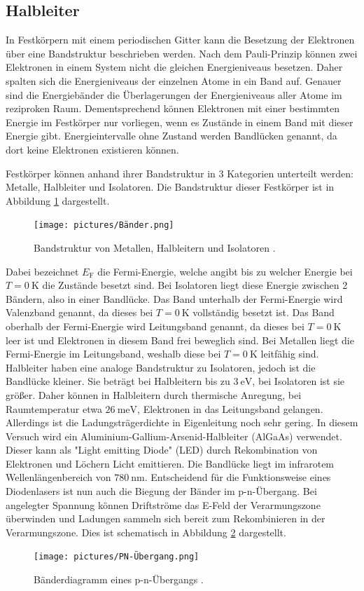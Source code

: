 \subsection{Halbleiter}
In Festkörpern mit einem periodischen Gitter kann die Besetzung der Elektronen über eine Bandstruktur beschrieben werden.
Nach dem Pauli-Prinzip können zwei Elektronen in einem System nicht die gleichen Energieniveaus besetzen. Daher spalten sich 
die Energieniveaus der einzelnen Atome in ein Band auf. Genauer sind die Energiebänder die Überlagerungen der Energieniveaus aller Atome im 
reziproken Raum. Dementsprechend können Elektronen mit einer bestimmten Energie im Festkörper nur vorliegen, wenn es Zustände in einem Band mit dieser 
Energie gibt. Energieintervalle ohne Zustand werden Bandlücken genannt, da dort keine Elektronen existieren können.

\noindent Festkörper können anhand ihrer Bandstruktur in 3 Kategorien unterteilt werden: Metalle, Halbleiter und Isolatoren.
Die Bandstruktur dieser Festkörper ist in Abbildung \ref{fig:Band} dargestellt.
\begin{figure}[H]
    \centering
    \texttt{[image: pictures/Bänder.png]}
    \caption{Bandstruktur von Metallen, Halbleitern und Isolatoren \cite{Demtröder}.}
    \label{fig:Band}
\end{figure}
\noindent Dabei bezeichnet $E_\text{F}$ die Fermi-Energie, welche angibt bis zu welcher Energie bei $T=\qty{0}{\kelvin}$ die Zustände besetzt sind.
Bei Isolatoren liegt diese Energie zwischen 2 Bändern, also in einer Bandlücke. Das Band unterhalb der Fermi-Energie wird Valenzband genannt, 
da dieses bei $T=\qty{0}{\kelvin}$ vollständig besetzt ist. Das Band oberhalb der Fermi-Energie wird Leitungsband genannt, da dieses bei $T=\qty{0}{\kelvin}$ leer ist und 
Elektronen in diesem Band frei beweglich sind. Bei Metallen liegt die Fermi-Energie im Leitungsband, weshalb diese bei $T=\qty{0}{\kelvin}$ leitfähig sind.
Halbleiter haben eine analoge Bandstruktur zu Isolatoren, jedoch ist die Bandlücke kleiner. Sie beträgt bei Halbleitern bis zu $\qty{3}{\eV}$, bei Isolatoren 
ist sie größer. Daher können in Halbleitern durch thermische Anregung, bei Raumtemperatur etwa $\qty{26}{\milli\eV}$, Elektronen in das Leitungsband gelangen. 
Allerdings ist die Ladungsträgerdichte in Eigenleitung noch sehr gering. In diesem Versuch wird ein Aluminium-Gallium-Arsenid-Halbleiter (AlGaAs) verwendet. Dieser kann als "Light emitting Diode" (LED)
durch Rekombination von Elektronen und Löchern Licht emittieren. Die Bandlücke liegt im infrarotem Wellenlängenbereich von $\qty{780}{\nano\meter}$.
Entscheidend für die Funktionsweise eines Diodenlasers ist nun auch die Biegung der Bänder im p-n-Übergang. Bei angelegter Spannung können 
Driftströme das E-Feld der Verarmungszone überwinden und Ladungen sammeln sich bereit zum Rekombinieren in der Verarmungszone.
Dies ist schematisch in Abbildung \ref{fig:PN} dargestellt. 
\begin{figure}[H]
    \centering
    \texttt{[image: pictures/PN-Übergang.png]}
    \caption{Bänderdiagramm eines p-n-Übergangs \cite{Demtröder}.}
    \label{fig:PN}
\end{figure}
